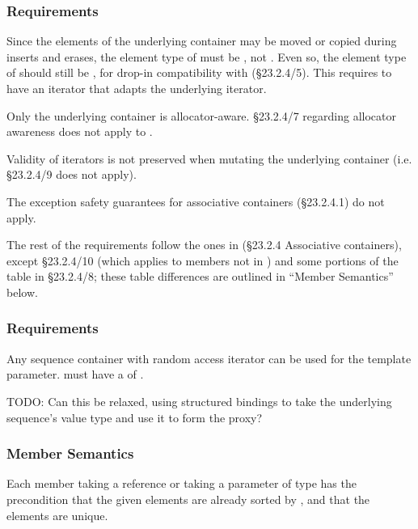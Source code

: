 \subsubsection{ Requirements}

Since the elements of the underlying container may be moved or copied during
inserts and erases, the element type of  must be
, not .  Even so, the element type
of  should still be , for drop-in
compatibility with  (\S23.2.4/5).  This requires  to
have an iterator that adapts the underlying  iterator.

Only the underlying container is allocator-aware.  \S23.2.4/7 regarding
allocator awareness does not apply to .

Validity of iterators is not preserved when mutating the underlying container
(i.e. \S23.2.4/9 does not apply).

The exception safety guarantees for associative containers (\S23.2.4.1) do not
apply.

The rest of the requirements follow the ones in (\S23.2.4 Associative
containers), except \S23.2.4/10 (which applies to members not in
) and some portions of the table in \S23.2.4/8; these table
differences are outlined in ``Member Semantics'' below.

\subsubsection{ Requirements}

Any sequence container with random access iterator can be used for the
 template parameter.   must have a
 of .

TODO: Can this be relaxed, using structured bindings to take the underlying
sequence's value type and use it to form the
 proxy?

\subsubsection{Member Semantics}

Each member taking a  reference or taking a parameter of type
 has the precondition that the given
elements are already sorted by , and that the elements are
unique.

